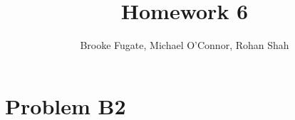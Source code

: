 \documentclass[12pt]{article}
\begin{document}
\pagestyle{plain}
\titleformat{\subsection}[runin]
  {\normalfont\large\bfseries}{\thesubsection}{1em}{}
\titleformat{\subsubsection}[runin]
  {\bfseries}{}{1em}{}

\title{Homework 6}
\author{Brooke Fugate, Michael O'Connor, Rohan Shah}
\date{}

\maketitle

\newpage
\section*{Problem B2}
\end{document}

